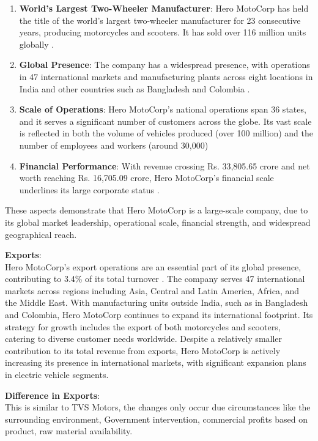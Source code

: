 \begin{enumerate}

	\item \textbf{World's Largest Two-Wheeler Manufacturer}: Hero MotoCorp has held the title of the world's largest two-wheeler manufacturer for 23 consecutive years, producing motorcycles and scooters. It has sold over 116 million units globally \cite{hero_sreport} \cite{hero-rep}.

	\item \textbf{Global Presence}: The company has a widespread presence, with operations in 47 international markets and manufacturing plants across eight locations in India and other countries such as Bangladesh and Colombia \cite{hero-rep}.

	\item \textbf{Scale of Operations}: Hero MotoCorp's national operations span 36 states, and it serves a significant number of customers across the globe. Its vast scale is reflected in both the volume of vehicles produced (over 100 million) and the number of employees and workers (around 30,000) \cite{hero-rep}

	\item \textbf{Financial Performance}: With revenue crossing Rs. 33,805.65 crore and net worth reaching Rs. 16,705.09 crore, Hero MotoCorp's financial scale underlines its large corporate status \cite{hero-rep}.

\end{enumerate}

These aspects demonstrate that Hero MotoCorp is a large-scale company, due to its global market leadership, operational scale, financial strength, and widespread geographical reach.

\textbf{Exports}: \\
Hero MotoCorp's export operations are an essential part of its global presence, contributing to 3.4\% of its total turnover \cite{hero_sreport}. The company serves 47 international markets across regions including Asia, Central and Latin America, Africa, and the Middle East\cite{hero_sreport}. With manufacturing units outside India, such as in Bangladesh and Colombia, Hero MotoCorp continues to expand its international footprint. Its strategy for growth includes the export of both motorcycles and scooters, catering to diverse customer needs worldwide. Despite a relatively smaller contribution to its total revenue from exports, Hero MotoCorp is actively increasing its presence in international markets, with significant expansion plans in electric vehicle segments\cite{hero_sreport}\cite{hero-rep}.

\textbf{Difference in Exports}:\\
This is similar to TVS Motors, the changes only occur due circumstances like the surrounding environment, Government intervention, commercial profits based on product, raw material availability.
